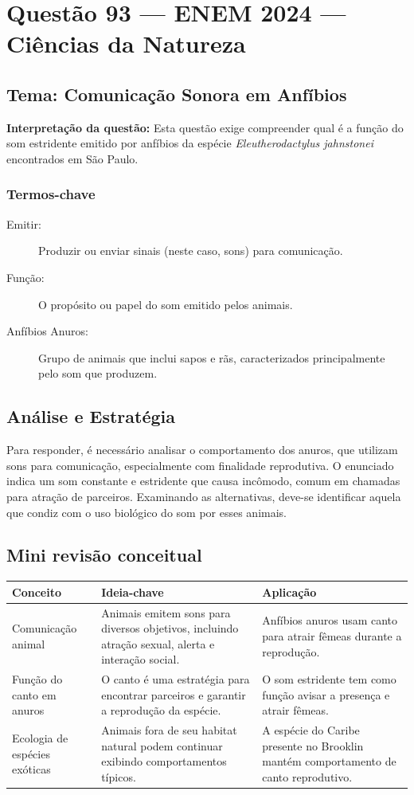 \documentclass{article}
\begin{document}
\section*{Questão 93 — ENEM 2024 — Ciências da Natureza}

\subsection*{Tema: Comunicação Sonora em Anfíbios}
\textbf{Interpretação da questão:} Esta questão exige compreender qual é a função do som estridente emitido por anfíbios da espécie \emph{Eleutherodactylus jahnstonei} encontrados em São Paulo.

\subsubsection*{Termos-chave}
\begin{description}
  \item[Emitir:] Produzir ou enviar sinais (neste caso, sons) para comunicação.
  \item[Função:] O propósito ou papel do som emitido pelos animais.
  \item[Anfíbios Anuros:] Grupo de animais que inclui sapos e rãs, caracterizados principalmente pelo som que produzem.
\end{description}

\subsection*{Análise e Estratégia}
Para responder, é necessário analisar o comportamento dos anuros, que utilizam sons para comunicação, especialmente com finalidade reprodutiva. O enunciado indica um som constante e estridente que causa incômodo, comum em chamadas para atração de parceiros. Examinando as alternativas, deve-se identificar aquela que condiz com o uso biológico do som por esses animais.

\subsection*{Mini revisão conceitual}
\begin{tabular}{|p{5cm}|p{5cm}|p{5cm}|}
\hline
\textbf{Conceito} & \textbf{Ideia-chave} & \textbf{Aplicação} \\ \hline
Comunicação animal & Animais emitem sons para diversos objetivos, incluindo atração sexual, alerta e interação social. & Anfíbios anuros usam canto para atrair fêmeas durante a reprodução. \\ \hline
Função do canto em anuros & O canto é uma estratégia para encontrar parceiros e garantir a reprodução da espécie. & O som estridente tem como função avisar a presença e atrair fêmeas. \\ \hline
Ecologia de espécies exóticas & Animais fora de seu habitat natural podem continuar exibindo comportamentos típicos. & A espécie do Caribe presente no Brooklin mantém comportamento de canto reprodutivo. \\ \hline
\end{tabular}
\end{document}
